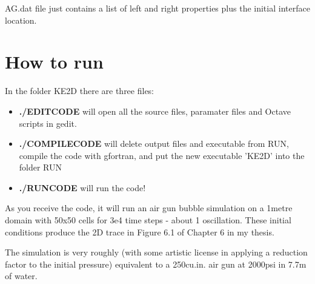\documentclass{article}
\begin{document}
AG.dat file just contains a list of left and right properties plus the initial interface location.

\section{How to run}
In the folder KE2D there are three files:

\begin{itemize}
\item \textbf{./EDITCODE} will open all the source files, paramater files and Octave scripts in gedit.
\item \textbf{./COMPILECODE} will delete output files and executable from RUN, compile the code with gfortran, and put the new executable 'KE2D' into the folder RUN
\item \textbf{./RUNCODE} will run the code!
\end{itemize}

As you receive the code, it will run an air gun bubble simulation on a 1metre domain with 50x50 cells for 3e4 time steps - about 1 oscillation. These initial conditions produce the 2D trace in Figure 6.1 of Chapter 6 in my thesis.

The simulation is very roughly (with some artistic license in applying a reduction factor to the initial pressure) equivalent to a 250cu.in. air gun at 2000psi in 7.7m of water.
\end{document}
